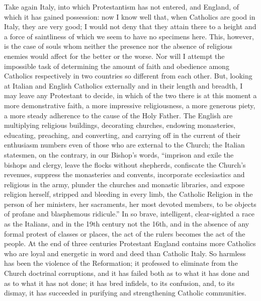 Take again Italy, into which Protestantism has not
entered, and England, of which it has gained possession:
now I know well that, when Catholics are good in Italy,
they are very good; I would not deny that they attain
there to a height and a force of saintliness of which we
seem to have no specimens here. This, however, is the
case of souls whom neither the presence nor the absence
of religious enemies would affect for the better or the
worse. Nor will I attempt the impossible task of
determining the amount of faith and obedience among
Catholics respectively in two countries so different from
each other. But, looking at Italian and English Catholics
externally and in their length and breadth, I may leave
any Protestant to decide, in which of the two there is at
this moment a more demonstrative faith, a more impressive
religiousness, a more generous piety, a more steady
adherence to the cause of the Holy Father. The English
are multiplying religious buildings, decorating churches,
endowing monasteries, educating, preaching, and
converting, and carrying off in the current of their
enthusiasm numbers even of those who are external to the
Church; the Italian statesmen, on the contrary, in our
Bishop's words, ``imprison and exile the bishops and
clergy, leave the flocks without shepherds, confiscate
the Church's revenues, suppress the monasteries and
convents, incorporate ecclesiastics and religious in the
army, plunder the churches and monastic libraries, and
expose religion herself, stripped and bleeding in every
limb, the Catholic Religion in the person of her
ministers, her sacraments, her most devoted members, to
be objects of profane and blasphemous ridicule.'' In
so brave, intelligent, clear-sighted a race as the
Italians, and in the 19th century not the 16th, and in
the absence of any formal protest of classes or places,
the act of the rulers becomes the act of the people. At
the end of three centuries Protestant England contains
more Catholics who are loyal and energetic in word and
deed than Catholic Italy. So harmless has been the
violence of the Reformation; it professed to eliminate
from the Church doctrinal corruptions, and it has failed
both as to what it has done and as to what it has not
done; it has bred infidels, to its confusion, and, to its
dismay, it has succeeded in purifying and strengthening
Catholic communities.

